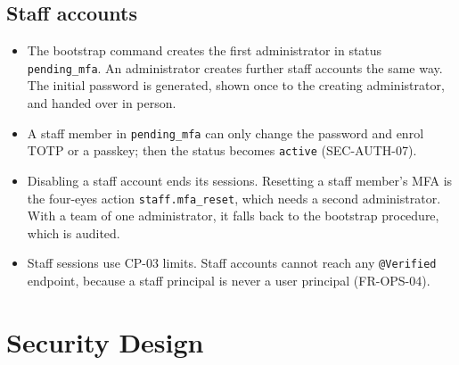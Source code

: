 \documentclass[11pt,a4paper]{article}
\begin{document}
\subsection{Staff accounts}
\begin{itemize}[nosep]
  \item The bootstrap command creates the first administrator in status \texttt{pending\_mfa}. An administrator creates further staff accounts the same way. The initial password is generated, shown once to the creating administrator, and handed over in person.
  \item A staff member in \texttt{pending\_mfa} can only change the password and enrol TOTP or a passkey; then the status becomes \texttt{active} (SEC-AUTH-07).
  \item Disabling a staff account ends its sessions. Resetting a staff member's MFA is the four-eyes action \texttt{staff.mfa\_reset}, which needs a second administrator. With a team of one administrator, it falls back to the bootstrap procedure, which is audited.
  \item Staff sessions use CP-03 limits. Staff accounts cannot reach any \texttt{@Verified} endpoint, because a staff principal is never a user principal (FR-OPS-04).
\end{itemize}
\section{Security Design}
\end{document}
